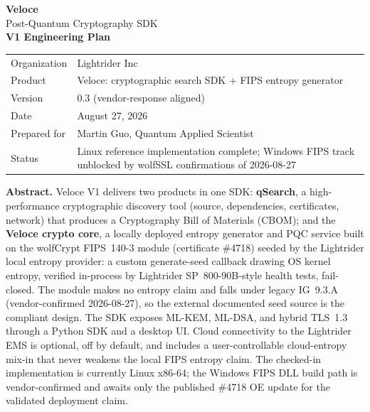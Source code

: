\documentclass[10pt]{article}
\begin{document}
\begin{titlepage}
\centering
{\Huge\sffamily\bfseries Veloce}\\[0.4em]
{\LARGE\sffamily Post-Quantum Cryptography SDK}\\[2.5em]
{\huge\sffamily\bfseries V1 Engineering Plan}\\[3em]
\begin{tabular}{ll}
\toprule
Organization & Lightrider Inc \\
Product & Veloce: cryptographic search SDK + FIPS entropy generator \\
Version & 0.3 (vendor-response aligned) \\
Date & August 27, 2026 \\
Prepared for & Martin Guo, Quantum Applied Scientist \\
Status & Linux reference implementation complete; Windows FIPS track unblocked by
  wolfSSL confirmations of 2026-08-27 \\
\bottomrule
\end{tabular}
\vfill
\begin{minipage}{0.85\textwidth}
\small\sffamily
\textbf{Abstract.} Veloce V1 delivers two products in one SDK:
\textbf{qSearch}, a high-performance cryptographic discovery tool (source, dependencies,
certificates, network) that produces a Cryptography Bill of Materials (CBOM); and the
\textbf{Veloce crypto core}, a locally deployed
entropy generator and PQC service built on the wolfCrypt FIPS~140-3 module
(certificate \#4718) seeded by the Lightrider local entropy provider: a custom
generate-seed callback drawing OS kernel entropy, verified in-process by Lightrider
SP~800-90B-style health tests, fail-closed. The module makes no entropy claim and falls
under legacy IG~9.3.A (vendor-confirmed 2026-08-27), so the external documented seed
source is the compliant design. The SDK exposes ML-KEM, ML-DSA, and hybrid TLS~1.3
through a Python SDK and a desktop UI. Cloud connectivity to the Lightrider EMS is
optional, off by default, and includes a user-controllable cloud-entropy mix-in that
never weakens the local FIPS entropy claim.
The checked-in implementation is currently Linux x86-64; the Windows FIPS DLL build path
is vendor-confirmed and awaits only the published \#4718 OE update for the validated
deployment claim.
\end{minipage}
\vspace{2em}
\end{titlepage}
\end{document}

